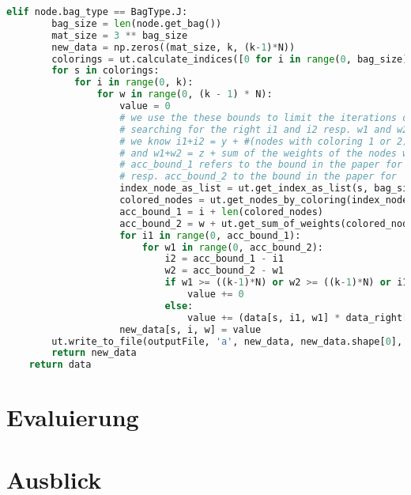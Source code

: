 \begin{svgraybox}
\begin{lstlisting}[language=python]
    elif node.bag_type == BagType.J:
        bag_size = len(node.get_bag())
        mat_size = 3 ** bag_size
        new_data = np.zeros((mat_size, k, (k-1)*N))
        colorings = ut.calculate_indices([0 for i in range(0, bag_size)], [i for i in range(0, bag_size)])
        for s in colorings:
            for i in range(0, k):
                for w in range(0, (k - 1) * N):
                    value = 0
                    # we use the these bounds to limit the iterations of the loops
                    # searching for the right i1 and i2 resp. w1 and w2
                    # we know i1+i2 = y + #(nodes with coloring 1 or 2)
                    # and w1+w2 = z + sum of the weights of the nodes with coloring 1 or 2
                    # acc_bound_1 refers to the bound in the paper for the 'i' index
                    # resp. acc_bound_2 to the bound in the paper for 'w' index
                    index_node_as_list = ut.get_index_as_list(s, bag_size)
                    colored_nodes = ut.get_nodes_by_coloring(index_node_as_list, [1, 2], indices)
                    acc_bound_1 = i + len(colored_nodes)
                    acc_bound_2 = w + ut.get_sum_of_weights(colored_nodes, weights)
                    for i1 in range(0, acc_bound_1):
                        for w1 in range(0, acc_bound_2):
                            i2 = acc_bound_1 - i1
                            w2 = acc_bound_2 - w1
                            if w1 >= ((k-1)*N) or w2 >= ((k-1)*N) or i1 >= k or i2 >= k:
                                value += 0
                            else:
                                value += (data[s, i1, w1] * data_right[s, i2, w2])
                    new_data[s, i, w] = value
        ut.write_to_file(outputFile, 'a', new_data, new_data.shape[0], str(node.bag_type) + str(node.get_bag()))
        return new_data
    return data
\end{lstlisting}
\end{svgraybox}
\section{Evaluierung}
\label{sec:eval}

\section{Ausblick}
\label{sec:outlook}

